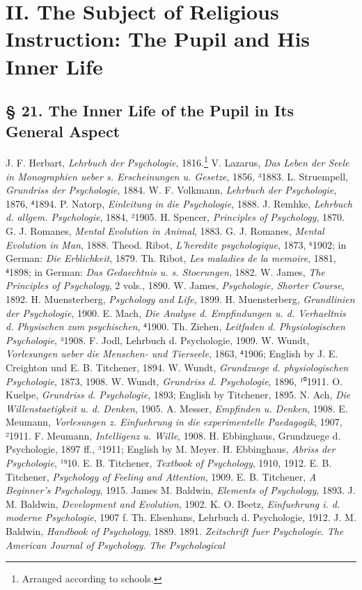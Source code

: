 \part[II. The Subject of Religious Instruction]{II. The Subject of Religious Instruction: The Pupil and His Inner Life}
\chapter[§ 21. The Inner Life of the Pupil]{§ 21. The Inner Life of the Pupil in Its General Aspect}

J. F. Herbart, \emph{Lehrbuch der Psychologie}, 1816.\footnote{Arranged according to schools.} V. Lazarus, \emph{Das Leben der Seele in Monographien ueber s. Erscheinungen u. Gesetze}, 1856, ³1883. L. Struempell, \emph{Grundriss der Psychologie}, 1884. W. F. Volkmann, \emph{Lehrbuch der Psychologie}, 1876, ⁴1894. P. Natorp, \emph{Einleitung in die Psychologie}, 1888. J. Remhke, \emph{Lehrbuch d. allgem. Psychologie}, 1884, ²1905. H. Spencer, \emph{Principles of Psychology}, 1870. G. J. Romanes, \emph{Mental Evolution in Animal}, 1883. G. J. Romanes, \emph{Mental Evolution in Man}, 1888. Theod. Ribot, \emph{L’heredite psychologique}, 1873, ⁶1902; in German: \emph{Die Erblichkeit}, 1879. Th. Ribot, \emph{Les maladies de la memoire}, 1881, ⁴1898; in German: \emph{Das Gedaechtnis u. s. Stoerungen}, 1882. W. James, \emph{The \emph{Principles of Psychology}}, 2 vols., 1890. W. James, \emph{Psychologie, Shorter Course}, 1892. H. Muensterberg, \emph{Psychology and Life}, 1899. H. Muensterberg, \emph{Grundlinien der Psychologie}, 1900. E. Mach, \emph{Die Analyse d. Empfindungen u. d. Verhaeltnis d. Physischen zum psychischen}, ⁴1900. Th. Ziehen, \emph{Leitfaden d. Physiologischen Psychologie}, ³1908. F. Jodl, Lehrbuch d. Psychologie, 1909. W. Wundt, \emph{Vorlesungen ueber die Menschen- und Tierseele}, 1863, ⁴1906; English by J. E. Creighton und E. B. Titchener, 1894. W. Wundt, \emph{Grundzuege d. physiologischen Psychologie}, 1873, 1908. W. Wundt, \emph{Grundriss d. Psychologie}, 1896, ¹⁰1911. O. Kuelpe, \emph{Grundriss d. Psychologie}, 1893; English by Titchener, 1895. N. Ach, \emph{Die Willenstaetigkeit u. d. Denken}, 1905. A. Messer, \emph{Empfinden u. Denken}, 1908. E. Meumann, \emph{Vorlesungen z. Einfuehrung in die experimentelle Paedagogik}, 1907, ²1911. F. Meumann, \emph{Intelligenz u. Wille}, 1908. H. Ebbinghaus, Grundzuege d. Psychologie, 1897 ff., ³1911; English by M. Meyer. H. Ebbinghaus, \emph{Abriss der Psychologie}, ¹⁹10. E. B. Titchener, \emph{Textbook of Psychology}, 1910, 1912. E. B. Titchener, \emph{Psychology of Feeling and Attention}, 1909. E. B. Titchener, \emph{A Beginner’s Psychology}, 1915. James M. Baldwin, \emph{Elements of Psychology}, 1893. J. M. Baldwin, \emph{Development and Evolution}, 1902. K. O. Beetz, \emph{Einfuehrung i. d. moderne Psychologie}, 1907 f. Th. Elsenhans, Lehrbuch d. Psychologie, 1912. J. M. Baldwin, \emph{Handbook of Psychology}, 1889. 1891. \emph{Zeitschrift fuer Psychologie}. \emph{The American Journal of Psychology}. \emph{The Psychological}
